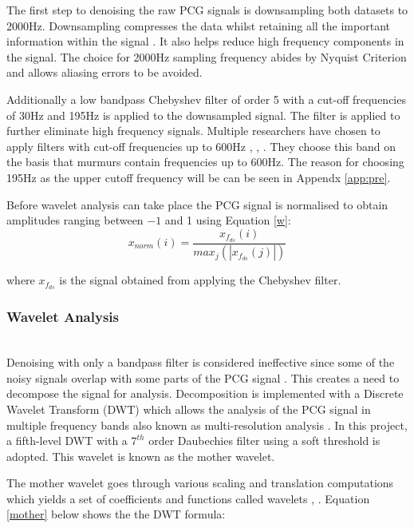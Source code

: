 \documentclass[10pt,twocolumn]{witseiepaper}
\begin{document}
The first step to denoising the raw PCG signals is downsampling both datasets to 2000Hz. Downsampling compresses the data whilst retaining all the important information within the signal \cite{lavry2004sampling}. It also helps reduce high frequency components in the signal. The choice for 2000Hz sampling frequency abides by Nyquist Criterion and allows aliasing errors to be avoided.

Additionally a low bandpass Chebyshev filter of order 5 with a cut-off frequencies of 30Hz and 195Hz is applied to the downsampled signal. The filter is applied to further eliminate high frequency signals. Multiple researchers have chosen to apply filters with cut-off frequencies up to 600Hz  \cite{26}, \cite{deng2012robust}, \cite{rangayyan1987phonocardiogram}. They choose this band on the basis that murmurs contain frequencies up to 600Hz. The reason for choosing 195Hz as the upper cutoff frequency will be can be seen in Appendx \ref{app:pre}.

Before wavelet analysis can take place the PCG signal is normalised to obtain amplitudes ranging between $-1$ and 1 using Equation \ref{w}: 
\begin{equation}
    x_{norm}(i) = \frac{x_{f_{ds}}(i)}{max_{j}(|x_{f_{ds}}(j)|)}
    \label{w}
\end{equation}

where $x_{f_{ds}}$ is the signal obtained from applying the Chebyshev filter. 

\subsubsection{Wavelet Analysis}
\textcolor{white}{.................}\\
Denoising with only a bandpass filter is considered ineffective since some of the noisy signals overlap with some parts of the PCG signal \cite{39}. This creates a need to decompose the signal for analysis. Decomposition is implemented with a Discrete Wavelet Transform (DWT) which allows the analysis of the PCG signal in multiple frequency bands also known as multi-resolution analysis \cite{38}. In this project, a fifth-level DWT with a $7^{th}$ order Daubechies filter using a soft threshold is adopted. This wavelet is known as the mother wavelet.

The mother wavelet goes through various scaling and translation computations which yields a set of coefficients and functions called wavelets \cite{meziani2012analysis}, \cite{debbal2008filtering}. Equation \ref{mother} below shows the the DWT formula: 
\end{document}
